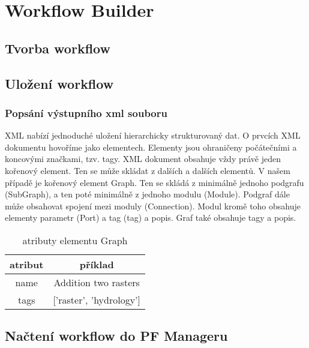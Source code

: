 \newpage
\chapter{Workflow Builder}

\section{Tvorba workflow}
\section{Uložení workflow}
\subsection{Popsání výstupního xml souboru}
XML nabízí jednoduché uložení hierarchicky strukturovaný dat. O prvcích XML dokumentu hovoříme jako elementech. Elementy jsou ohraničeny počátečními a koncovými značkami, tzv. tagy. XML dokument obsahuje vždy právě jeden kořenový element. Ten se může skládat z dalších a dalších elementů. V našem případě je kořenový element Graph. Ten se skládá z minimálně jednoho podgrafu (SubGraph), a ten poté minimálně z jednoho modulu (Module). Podgraf dále může obsahovat spojení mezi moduly (Connection). Modul kromě toho obsahuje elementy parametr (Port) a tag (tag) a popis. Graf také obsahuje tagy a popis. 

\begin{table}	
	\centering
	\begin{tabular}{|c|c|}
		\hline
		atribut & příklad \\
		\hline
		name & Addition two rasters \\
		tags & ['raster', 'hydrology'] \\	
		\hline	
	\end{tabular}
	\caption{atributy elementu Graph}
	\label{tab:graph}
\end{table}

\section{Načtení workflow do PF Manageru}

